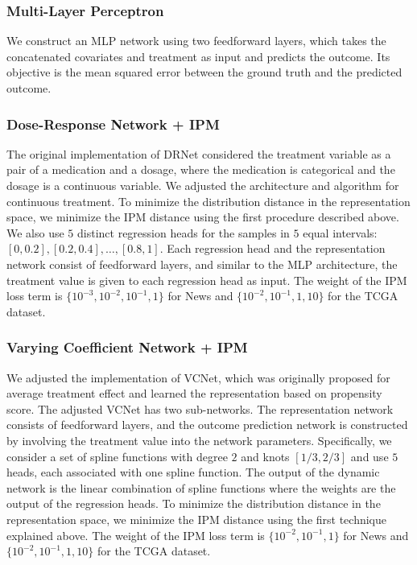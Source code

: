 \documentclass[letterpaper]{article} %
\begin{document}
\subsubsection{Multi-Layer Perceptron}
We construct an MLP network using two feedforward layers, which takes the concatenated covariates and treatment as input and predicts the outcome. Its objective is the mean squared error between the ground truth and the predicted outcome.

\subsubsection{Dose-Response Network + IPM}
The original implementation of DRNet considered the treatment variable as a pair of a medication and a dosage, where the medication is categorical and the dosage is a continuous variable. We adjusted the architecture and algorithm for continuous treatment. To minimize the distribution distance in the representation space, we minimize the IPM distance using the first procedure described above. We also use $5$ distinct regression heads for the samples in $5$ equal intervals: $[0, 0.2], [0.2, 0.4], \dots, [0.8, 1]$. Each regression head and the representation network consist of feedforward layers, and similar to the MLP architecture, the treatment value is given to each regression head as input. The weight of the IPM loss term is $\{10^{-3}, 10^{-2}, 10^{-1}, 1\}$ for News and $\{10^{-2}, 10^{-1}, 1, 10\}$ for the TCGA dataset.

\subsubsection{Varying Coefficient Network + IPM}
We adjusted the implementation of VCNet, which was originally proposed for average treatment effect and learned the representation based on propensity score. The adjusted VCNet has two sub-networks. The representation network consists of feedforward layers, and the outcome prediction network is constructed by involving the treatment value into the network parameters. Specifically, we consider a set of spline functions with degree $2$ and knots $[1/3, 2/3]$ and use $5$ heads, each associated with one spline function. The output of the dynamic network is the linear combination of spline functions where the weights are the output of the regression heads. To minimize the distribution distance in the representation space, we minimize the IPM distance using the first technique explained above. The weight of the IPM loss term is $\{10^{-2}, 10^{-1}, 1\}$ for News and $\{10^{-2}, 10^{-1}, 1, 10\}$ for the TCGA dataset.
\end{document}
